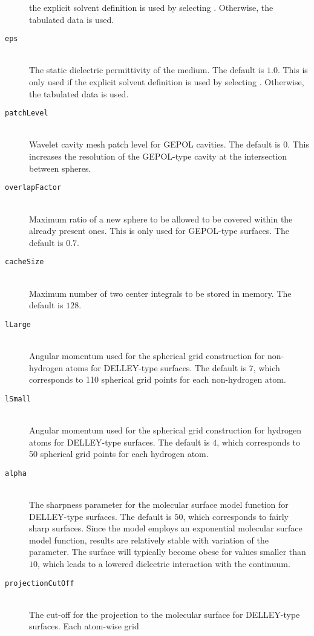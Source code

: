\begin{description}
    the explicit solvent definition is used by selecting . Otherwise, the tabulated
    data is used.
    \item [\texttt{eps}]\hfill \\
    The static dielectric permittivity of the medium. The default is $1.0$. This is only used if 
    the explicit solvent definition is used by selecting . Otherwise, the tabulated
    data is used.  
    \item [\texttt{patchLevel}]\hfill \\
    Wavelet cavity mesh patch level for GEPOL cavities. The default is $0$. This increases the resolution of the 
    GEPOL-type cavity at the intersection between spheres.
    \item [\texttt{overlapFactor}]\hfill \\
    Maximum ratio of a new sphere to be allowed to be covered within the already present ones. This is only used for 
    GEPOL-type surfaces. The default is $0.7$.  
    \item [\texttt{cacheSize}]\hfill \\
    Maximum number of two center integrals to be stored in memory. The default is $128$.
    \item [\texttt{lLarge}]\hfill \\
    Angular momentum used for the spherical grid construction for non-hydrogen atoms for DELLEY-type surfaces. The default
    is $7$, which corresponds to 110 spherical grid points for each  non-hydrogen atom.
    \item [\texttt{lSmall}]\hfill \\
    Angular momentum used for the spherical grid construction for hydrogen atoms for DELLEY-type surfaces. The default
    is $4$, which corresponds to 50 spherical grid points for each hydrogen atom.
    \item [\texttt{alpha}]\hfill \\
    The sharpness parameter for the molecular surface model function for DELLEY-type surfaces. The default
    is $50$, which corresponds to fairly sharp surfaces. Since the model employs an exponential 
    molecular surface model function, results are relatively stable with variation of the parameter. The surface 
    will typically become obese for values smaller than $10$, which leads to a lowered dielectric interaction with 
    the continuum.
    \item [\texttt{projectionCutOff}]\hfill \\
    The cut-off for the projection to the molecular surface for DELLEY-type surfaces. Each atom-wise grid 

\end{description}
